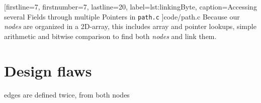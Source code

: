 
[firstline=7,				%
firstnumber=7,
lastline=20,
label=lst:linkingByte,	%
caption={Accessing several Fields through multiple Pointers in {\tt path.c}}
]{code/path.c}
%
Because our \emph{nodes} are organized in a 2D-array,
this includes array and pointer lookups,
simple arithmetic and
bitwise comparison
to find both \emph{nodes} and link them.

\section{Design flaws}
edges are defined twice, from both nodes
